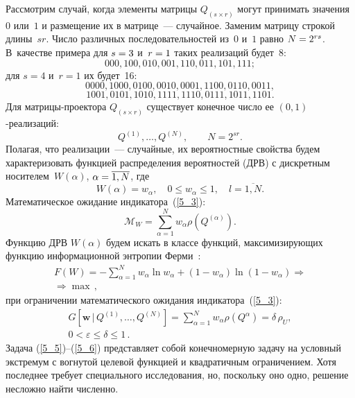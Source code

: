 \begin{multicols}{2}
Рассмотрим случай, когда элементы матрицы $Q_{(s \times r)}$ могут принимать 
значения~$0$ или~$1$ и размещение их в матрице~--- случайное. Заменим матрицу 
строкой длины~$sr$. Число различных последовательностей из~$0$ и~$1$ равно $N 
\hm= 2^{rs}$. В~качестве примера для $s \hm= 3$ и~$r \hm= 1$ таких реализаций 
будет~8:
$$
000, 100, 010, 001, 110, 011, 101, 111;
$$
для $s = 4$ и~$r = 1$ их будет~16:
$$
0000, 1000, 0100, 0010, 0001, 1100, 0110, 0011,
$$
$$
1001, 0101, 1010, 1111, 1110, 0111, 1011, 1101.
$$
Для матрицы-проектора $Q_{(s \times r)}$ существует конечное число ее 
$(0,1)$-реализаций:
\begin{equation*}
Q^{(1)}, \dots,  Q^{(N)},\qquad N = 2^{sr}.
\end{equation*}
Полагая, что реализации~--- случайные, их вероятностные свойства будем 
характеризовать  функцией распределения вероятностей (ДРВ) с дискретным 
носителем~$W(\alpha)$, $\alpha \hm= \overline{1,N}$, где
\begin{equation*}
W(\alpha) = w_{\alpha},\quad 0 \le w_{\alpha} \le 1,\quad l = \overline{1,N}.
\end{equation*}
Математическое ожидание индикатора~(\ref{5_3}):
\begin{equation*}
\mathcal{M}_{W} = \sum\limits^N_{\alpha=1} w_{\alpha} \rho(Q^{(\alpha)}).
\end{equation*}
Функцию ДРВ $W(\alpha)$ будем искать в классе функций, максимизирующих 
функцию информационной энтропии Ферми~\cite{Popkov_1995}:
\begin{multline}
\label{5_5}
\!\!F(W) = - \sum\limits^N_{\alpha=1} w_{\alpha} \ln w_{\alpha} + (1 - 
w_{\alpha})\ln(1 - w_{\alpha}) \Rightarrow{}\\
{}\Rightarrow \max\,,
\end{multline}
при ограничении математического ожидания индикатора~(\ref{5_3}):
\begin{multline}
\label{5_6}
G[\mathbf{w}\,|\,Q^{(1)}, \dots, Q^{(N)}] = \sum\limits^N_{\alpha=1} 
w_{\alpha} \rho(Q^{\alpha}) = \delta\,\rho_U,\\
 0 < \varepsilon \le 
\delta \le 1\,.
\end{multline}
Задача (\ref{5_5})--(\ref{5_6}) представляет собой конечномерную задачу на 
условный экстремум с вогнутой целевой функцией и квадратичным ограничением. 
Хотя последнее требует специального исследования, но, поскольку оно одно, 
решение несложно найти чис\-ленно.


\end{multicols}
